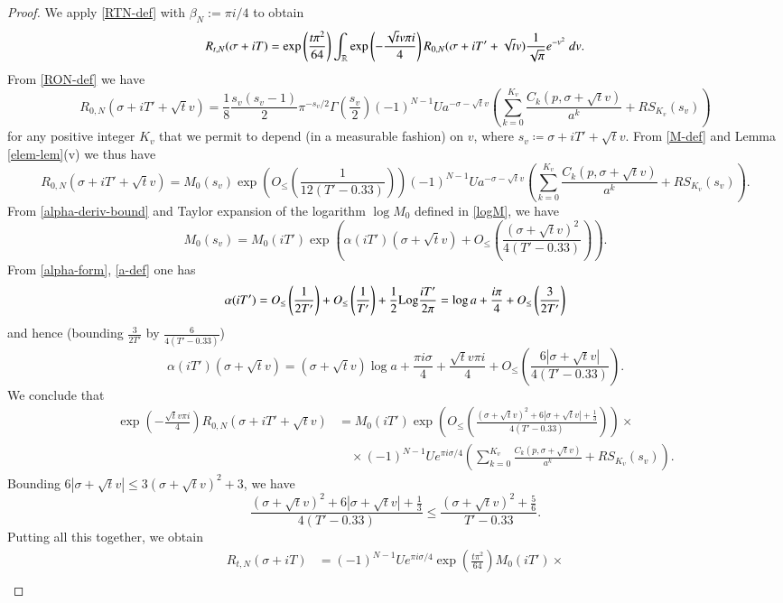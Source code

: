 \begin{proof}  We apply \eqref{RTN-def} with $\beta_N := \pi i/4$ to obtain
$$ R_{t,N}(\sigma+iT) = \exp\left( \frac{t \pi^2}{64}\right) \int_{\mathbb{R}} \exp\left( - \frac{\sqrt{t} v \pi i}{4}\right) R_{0,N}( \sigma+iT' + \sqrt{t} v) \frac{1}{\sqrt{\pi}} e^{-v^2}\ dv.$$
From \eqref{RON-def} we have
$$ R_{0,N}( \sigma+iT' + \sqrt{t} v) = \frac{1}{8} \frac{s_v(s_v-1)}{2} \pi^{-s_v/2} \Gamma\left(\frac{s_v}{2}\right) (-1)^{N-1} U a^{-\sigma-\sqrt{t} v}
\left(\sum_{k=0}^{K_v} \frac{C_k(p,\sigma + \sqrt{t} v)}{a^k} + RS_{K_v}(s_v)\right) $$
for any positive integer $K_v$ that we permit to depend (in a measurable fashion) on $v$, where $s_v \coloneqq \sigma + iT' + \sqrt{t} v$. From \eqref{M-def} and Lemma \ref{elem-lem}(v) we thus have
$$ R_{0,N}( \sigma+iT' + \sqrt{t} v) = M_0(s_v) \exp\left( O_{\leq}\left(\frac{1}{12(T'-0.33)}\right) \right) (-1)^{N-1} U a^{-\sigma-\sqrt{t} v}
\left(\sum_{k=0}^{K_v} \frac{C_k(p,\sigma + \sqrt{t} v)}{a^k} + RS_{K_v}(s_v)\right).$$
From \eqref{alpha-deriv-bound} and Taylor expansion of the logarithm $\log M_0$ defined in \eqref{logM}, we have
$$ M_0(s_v) = M_0(iT') \exp\left( \alpha(iT') (\sigma + \sqrt{t} v) + O_{\leq}\left( \frac{(\sigma + \sqrt{t} v)^2}{4(T'-0.33)} \right) \right).$$
From \eqref{alpha-form}, \eqref{a-def} one has
$$ \alpha(iT') = O_{\leq}\left( \frac{1}{2T'}\right) + O_{\leq}\left( \frac{1}{T'}\right) + \frac{1}{2} {\operatorname{Log}} \frac{iT'}{2\pi} = \log a + \frac{i\pi}{4} + O_{\leq}\left( \frac{3}{2T'}\right)$$
and hence (bounding $\frac{3}{2T'}$ by $\frac{6}{4(T'-0.33)}$)
$$ \alpha(iT') (\sigma + \sqrt{t} v)  = (\sigma + \sqrt{t} v)  \log a + \frac{\pi i \sigma}{4} + \frac{\sqrt{t} v \pi i}{4} + O_{\leq}\left( \frac{6 |\sigma+\sqrt{t} v|}{4(T'-0.33)} \right).$$ 
We conclude that
\begin{align*}
\exp\left( - \frac{\sqrt{t} v \pi i}{4}\right) R_{0,N}( \sigma+iT' + \sqrt{t} v) &= 
M_0(iT') \exp\left( O_{\leq}\left(\frac{(\sigma + \sqrt{t} v)^2+6|\sigma+\sqrt{t} v|+\frac{1}{3}}{4(T'-0.33)} \right)\right) \times \\
&\quad \times (-1)^{N-1} U  e^{\pi i \sigma/4} \left(\sum_{k=0}^{K_v} \frac{C_k(p, \sigma+\sqrt{t} v)}{a^k} + RS_{K_v}(s_v)\right).
\end{align*}
Bounding $6|\sigma+\sqrt{t} v| \leq 3 (\sigma + \sqrt{t} v)^2 + 3$, we have
$$ \frac{(\sigma + \sqrt{t} v)^2+6|\sigma+\sqrt{t} v|+\frac{1}{3}}{4(T'-0.33)}  \leq \frac{(\sigma + \sqrt{t} v)^2 + \frac{5}{6}}{T'-0.33}.$$
Putting all this together, we obtain
\begin{align*}
 R_{t,N}(\sigma+iT) &= (-1)^{N-1} U e^{\pi i \sigma/4} \exp\left( \frac{t \pi^2}{64}\right) M_0(iT') \times \\

\end{align*}
\end{proof}
